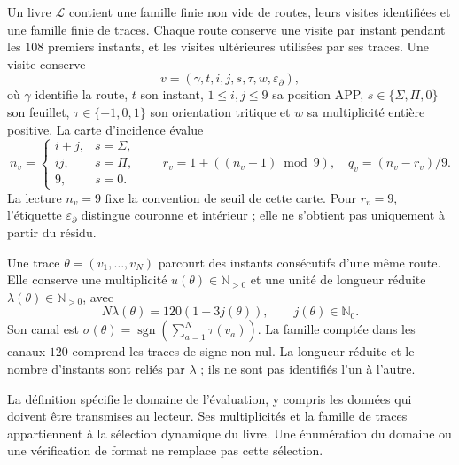 \begin{definition}
\label{vi:vi:dep:libro-dominio}
Un livre \(\mathscr L\) contient une famille finie non vide de routes,
leurs visites identifiées et une famille finie de traces. Chaque route
conserve une visite par instant pendant les \(108\) premiers instants,
et les visites ultérieures utilisées par ses traces. Une visite conserve
\[
 v=(\gamma,t,i,j,s,\tau,w,\varepsilon_\partial),
\]
où \(\gamma\) identifie la route, \(t\) son instant, \(1\le i,j\le9\)
sa position APP, \(s\in\{\Sigma,\Pi,0\}\) son feuillet,
\(\tau\in\{-1,0,1\}\) son orientation tritique et \(w\) sa multiplicité
entière positive. La carte d'incidence évalue
\[
 n_v=
 \begin{cases}
 i+j,&s=\Sigma,\\
 ij,&s=\Pi,\\
 9,&s=0.
 \end{cases}
 \qquad
 r_v=1+((n_v-1)\bmod9),\quad q_v=(n_v-r_v)/9.
\]
La lecture \(n_v=9\) fixe la convention de seuil de cette carte.
Pour \(r_v=9\), l'étiquette \(\varepsilon_\partial\) distingue
couronne et intérieur ; elle ne s'obtient pas uniquement à partir du résidu.

Une trace \(\theta=(v_1,\ldots,v_N)\) parcourt des instants consécutifs d’une
même route. Elle conserve une multiplicité \(u(\theta)\in\mathbb N_{>0}\)
et une unité de longueur réduite
\(\lambda(\theta)\in\mathbb N_{>0}\), avec
\[
 N\lambda(\theta)=120(1+3j(\theta)),\qquad j(\theta)\in\mathbb N_0.
\]
Son canal est
\(\sigma(\theta)=\operatorname{sgn}(\sum_{a=1}^N\tau(v_a))\).
La famille comptée dans les canaux \(120\) comprend les traces de
signe non nul. La longueur réduite et le nombre d'instants sont
reliés par \(\lambda\) ; ils ne sont pas identifiés l'un à l'autre.
\end{definition}

La définition spécifie le domaine de l'évaluation, y compris les
données qui doivent être transmises au lecteur. Ses multiplicités et la famille
de traces appartiennent à la sélection dynamique du livre. Une énumération
du domaine ou une vérification de format ne remplace pas cette sélection.


